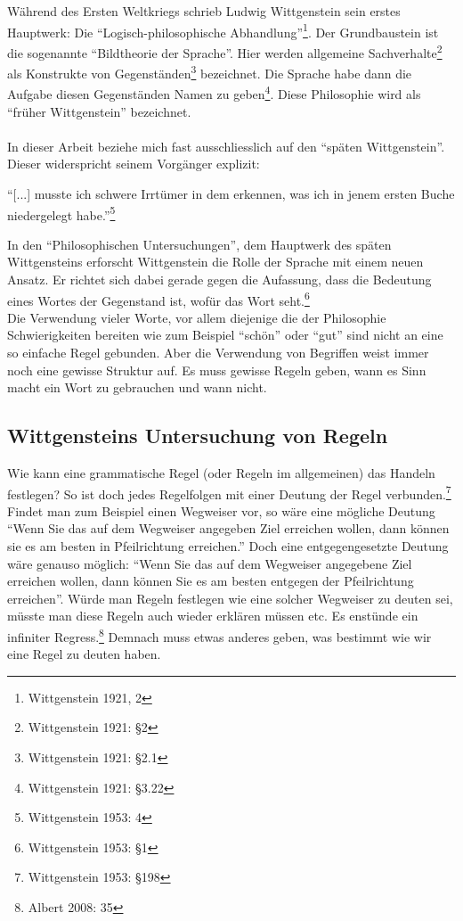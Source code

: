 \documentclass[10pt,a4paper]{article}
\begin{document}
Während des Ersten Weltkriegs schrieb Ludwig Wittgenstein sein erstes Hauptwerk: Die \enquote{Logisch-philosophische Abhandlung}\footnote{Wittgenstein 1921, 2}. Der Grundbaustein ist die sogenannte \enquote{Bildtheorie der Sprache}. Hier werden allgemeine Sachverhalte\footnote{Wittgenstein 1921: §2} als Konstrukte von Gegenständen\footnote{Wittgenstein 1921: §2.1} bezeichnet. Die Sprache habe dann die Aufgabe diesen Gegenständen Namen zu geben\footnote{Wittgenstein 1921: §3.22}. Diese Philosophie wird als \enquote{früher Wittgenstein} bezeichnet. \\
\\
In dieser Arbeit beziehe mich fast ausschliesslich auf den \enquote{späten Wittgenstein}. Dieser widerspricht seinem Vorgänger explizit:
\begin{displayquote}
\enquote{[...] musste ich schwere Irrtümer in dem erkennen, was ich in jenem ersten Buche niedergelegt habe.}\footnote{Wittgenstein 1953: 4}
\end{displayquote}
In den \enquote{Philosophischen Untersuchungen}, dem Hauptwerk des späten Wittgensteins erforscht Wittgenstein die Rolle der Sprache mit einem neuen Ansatz. Er richtet sich dabei gerade gegen die Aufassung, dass die Bedeutung eines Wortes der Gegenstand ist, wofür das Wort seht.\footnote{Wittgenstein 1953: §1} \\
Die Verwendung vieler Worte, vor allem diejenige die der Philosophie Schwierigkeiten bereiten wie zum Beispiel \enquote{schön} oder \enquote{gut} sind nicht an eine so einfache Regel gebunden. Aber die Verwendung von Begriffen weist immer noch eine gewisse Struktur auf. Es muss gewisse Regeln geben, wann es Sinn macht ein Wort zu gebrauchen und wann nicht.


\subsection{Wittgensteins Untersuchung von Regeln}
Wie kann eine grammatische Regel (oder Regeln im allgemeinen) das Handeln festlegen? So ist doch jedes Regelfolgen mit einer Deutung der Regel verbunden.\footnote{Wittgenstein 1953: §198} \\
Findet man zum Beispiel einen Wegweiser vor, so wäre eine mögliche Deutung \enquote{Wenn Sie das auf dem Wegweiser angegeben Ziel erreichen wollen, dann können sie es am besten in Pfeilrichtung erreichen.} Doch eine entgegengesetzte Deutung wäre genauso möglich: \enquote{Wenn Sie das auf dem Wegweiser angegebene Ziel erreichen wollen, dann können Sie es am besten entgegen der Pfeilrichtung erreichen}. Würde man Regeln festlegen wie eine solcher Wegweiser zu deuten sei, müsste man diese Regeln auch wieder erklären müssen etc. Es enstünde ein infiniter Regress.\footnote{Albert 2008: 35} Demnach muss etwas anderes geben, was bestimmt wie wir eine Regel zu deuten haben.
\end{document}

